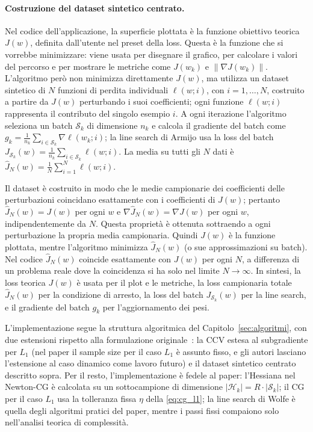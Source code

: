 \documentclass[italian, a4paper, twoside, binding=6mm]{sapthesis}
\begin{document}
\paragraph{Costruzione del dataset sintetico centrato.}
Nel codice dell'applicazione, la superficie plottata è la funzione obiettivo
teorica $J(w)$, definita dall'utente nel preset della loss. Questa è la
funzione che si vorrebbe minimizzare: viene usata per disegnare il grafico,
per calcolare i valori del percorso e per mostrare le metriche come $J(w_k)$
e $\|\nabla J(w_k)\|$. L'algoritmo però non minimizza direttamente $J(w)$,
ma utilizza un dataset sintetico di $N$ funzioni di perdita individuali
$\ell(w; i)$, con $i = 1,\dots,N$, costruito a partire da $J(w)$ perturbando
i suoi coefficienti; ogni funzione $\ell(w; i)$ rappresenta il contributo del
singolo esempio $i$. A ogni iterazione l'algoritmo seleziona un batch
$\mathcal{S}_k$ di dimensione $n_k$ e calcola il gradiente del batch come
$g_k = \frac{1}{n_k}\sum_{i \in \mathcal{S}_k}\nabla \ell(w_k; i)$; la line
search di Armijo usa la loss del batch
$J_{\mathcal{S}_k}(w) = \frac{1}{n_k}\sum_{i \in \mathcal{S}_k}\ell(w; i)$.
La media su tutti gli $N$ dati è
$\hat J_N(w) = \frac{1}{N}\sum_{i=1}^N \ell(w; i)$.

Il dataset è costruito in modo che le medie campionarie dei coefficienti
delle perturbazioni coincidano esattamente con i coefficienti di
$J(w)$; pertanto $\hat J_N(w) = J(w)$ per ogni $w$ e
$\nabla \hat J_N(w) = \nabla J(w)$ per ogni $w$, indipendentemente da $N$.
Questa proprietà è ottenuta sottraendo a ogni perturbazione la propria media
campionaria. Quindi $J(w)$ è la funzione plottata, mentre l'algoritmo
minimizza $\hat J_N(w)$ (o sue approssimazioni su batch). Nel codice
$\hat J_N(w)$ coincide esattamente con $J(w)$ per ogni $N$, a differenza di
un problema reale dove la coincidenza si ha solo nel limite $N \to \infty$.
In sintesi, la loss teorica $J(w)$ è usata per il plot e le metriche, la loss
campionaria totale $\hat J_N(w)$ per la condizione di arresto, la loss del
batch $J_{\mathcal{S}_k}(w)$ per la line search, e il gradiente del batch
$g_k$ per l'aggiornamento dei pesi.

L'implementazione segue la struttura algoritmica del
Capitolo~\ref{sec:algoritmi}, con due estensioni rispetto alla formulazione
originale~\cite{byrd2012}: la CCV estesa al subgradiente per $L_1$ (nel
paper il sample size per il caso $L_1$ è assunto fisso, e gli autori
lasciano l'estensione al caso dinamico come lavoro futuro) e il dataset
sintetico centrato descritto sopra. Per il resto, l'implementazione è fedele
al paper: l'Hessiana nel Newton-CG è calcolata su un sottocampione di
dimensione $|\mathcal{H}_k| = R \cdot |\mathcal{S}_k|$; il CG per il caso
$L_1$ usa la tolleranza fissa $\eta$ della \eqref{eq:cg_l1}; la line search
di Wolfe è quella degli algoritmi pratici del paper, mentre i passi fissi
compaiono solo nell'analisi teorica di complessità.
\end{document}
